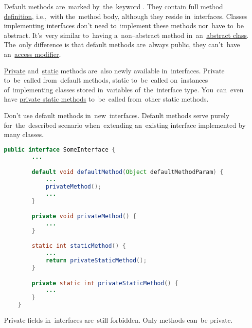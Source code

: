 Default methods are~marked by~the~keyword .
They contain full method \hyperref[declarationdefinition]{definition}, i.e.,~with the~method body, although they reside in~interfaces.
Classes implementing interfaces don't need to~implement these methods nor~have to~be abstract.
It's~very similar to~having a~non--abstract method in~an~\hyperref[javaabstractclasses]{abstract class}.
The~only difference is that default methods are~always public, they can't~have an~\hyperref[javaaccessmodifiers]{access modifier}.

\hyperref[javaprivate]{Private} and~\hyperref[javastatic]{static} methods are~also newly available in~interfaces.
Private to~be~called from~default methods, static to~be~called on~instances of~implementing classes stored in~variables of~the~interface type.
You~can~even have \hyperref[javaprivatestaticmethods]{private static methods} to~be~called from~other static methods.

\warning Don't use default methods in~new~interfaces.
Default methods serve purely for~the~described scenario when~extending an~existing interface implemented by many classes.

\begin{lstlisting}[language=Java]
    public interface SomeInterface {
        ...

        default void defaultMethod(Object defaultMethodParam) {
            ...
            privateMethod();
            ...
        }

        private void privateMethod() {
            ...
        }

        static int staticMethod() {
            ...
            return privateStaticMethod();
        }

        private static int privateStaticMethod() {
            ...
        }
    }
\end{lstlisting}

\note Private fields in~interfaces are~still forbidden.
Only methods can~be private.
